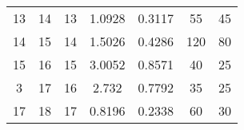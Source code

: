 \begin{table}
\begin{adjustbox}{width=1.2\textwidth,center=\textwidth}
\begin{tabular}{ccccccc}
13                                                        & 14                                                          & 13                                                  & 1.0928                                                                     & 0.3117                                                                    & 55                                                                          & 45                                                                               \\
14                                                        & 15                                                          & 14                                                  & 1.5026                                                                     & 0.4286                                                                    & 120                                                                         & 80                                                                               \\
15                                                        & 16                                                          & 15                                                  & 3.0052                                                                     & 0.8571                                                                    & 40                                                                          & 25                                                                               \\
3                                                         & 17                                                          & 16                                                  & 2.732                                                                      & 0.7792                                                                    & 35                                                                          & 25                                                                               \\
17                                                        & 18                                                          & 17                                                  & 0.8196                                                                     & 0.2338                                                                    & 60                                                                          & 30                                                                               \\

\end{tabular}
\end{adjustbox}
\end{table}
